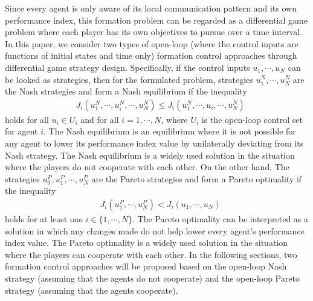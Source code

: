 \documentclass[12pt,draftcls,onecolumn]{IEEEtran}  %
\begin{document}
Since every agent is only aware of its local communication pattern and its own performance index, this formation problem can be regarded as a differential game problem where each player {has} its own objectives to pursue over a time interval. In this paper, we consider two types of open-loop {(where the control inputs are functions of initial states and time only)} formation control approaches through {differential} game strategy design. Specifically, {if the control inputs $u_1,\cdots,u_N$ can be looked as strategies}, then for the formulated problem, strategies {$u^{N}_{1},\cdots,u^{N}_N$} are the Nash strategies and form a Nash equilibrium if the inequality
\begin{align}
&{J_{i}(u_1^{N},\cdots,u^{N}_i,\cdots,u^{N}_N)\leq J_{i}(u_1^{N},\cdots,u_i,\cdots,u^{N}_N)}\label{Nashinequality}
\end{align}
holds for all $u_i\in U_i$ and for all $i=1,\cdots,N$, where $U_i$ is the open-loop control set for agent $i$. The Nash equilibrium is an equilibrium where it is not possible for any agent to lower its performance index value by unilaterally deviating from its Nash strategy. The Nash equilibrium is a widely used solution in the situation where the players do not {cooperate} with each other. On the other hand, The strategies $u^{P}_0,u^{P}_{1},\cdots,u^{P}_N$ are the Pareto strategies and {form a Pareto optimality if the inequality
\begin{align}
&J_{i}(u^P_1,\cdots,u^P_N)< J_{i}(u_1,\cdots,u_N) \label{inequality}
\end{align}
holds for at least one $i\in\{1,\cdots,N\}$.} The Pareto optimality can be interpreted as a solution in which any changes made do not help lower every agent's performance index value. The Pareto optimality is a widely used solution in the situation where the players can {cooperate} with each other. In the following sections, two formation control approaches will be proposed based on the open-loop Nash strategy (assuming that the agents do not {cooperate}) and the open-loop Pareto strategy (assuming that the agents {cooperate}).

\end{document}
